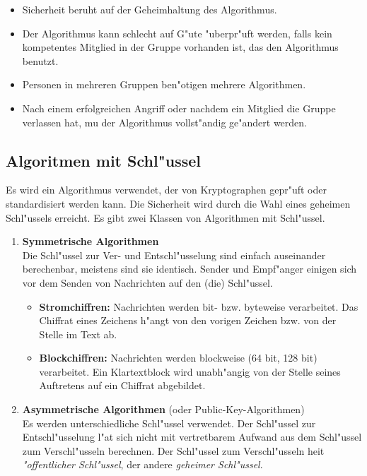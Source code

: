 \begin{itemize}
  \item Sicherheit beruht auf der Geheimhaltung des Algorithmus.
  \item Der Algorithmus kann schlecht auf G"ute "uberpr"uft werden, 
        falls kein kompetentes Mitglied in der Gruppe vorhanden ist, 
        das den Algorithmus benutzt.
  \item Personen in mehreren Gruppen ben"otigen mehrere Algorithmen.
  \item Nach einem erfolgreichen Angriff oder nachdem ein Mitglied die Gruppe
        verlassen hat, mu\3 der Algorithmus vollst"andig ge"andert werden.
\end{itemize}


\subsection*{Algoritmen mit Schl"ussel}

Es wird ein Algorithmus verwendet, der von Kryptographen gepr"uft oder
standardisiert werden kann. Die Sicherheit wird durch die Wahl eines
geheimen Schl"ussels erreicht.  Es gibt zwei Klassen von Algorithmen
mit Schl"ussel.
\begin{enumerate}
  \item{\bf Symmetrische Algorithmen}\\
    Die Schl"ussel zur Ver- und Entschl"usselung sind einfach auseinander berechenbar, 
    meistens sind sie identisch. Sender und Empf"anger einigen sich vor dem Senden 
    von Nachrichten auf den (die) Schl"ussel.
  \begin{itemize}
    \item {\bf  Stromchiffren:} Nachrichten werden bit- bzw. byteweise verarbeitet. 
          Das Chiffrat eines Zeichens h"angt von den vorigen Zeichen bzw. von der Stelle im
          Text ab.
    \item {\bf Blockchiffren:} Nachrichten  werden blockweise (64 bit, 128 bit) verarbeitet. 
          Ein Klartextblock wird unabh"angig von der Stelle seines Auftretens auf ein
          Chiffrat abgebildet.
  \end{itemize}
 \item{\bf Asymmetrische Algorithmen} (oder Public-Key-Algorithmen) \\
  Es werden unterschiedliche Schl"ussel verwendet. Der Schl"ussel zur Entschl"usselung 
  l"a\3t sich nicht mit vertretbarem Aufwand aus dem Schl"ussel zum
  Verschl"usseln berechnen. Der Schl"ussel zum Verschl"usseln hei\3t 
  {\em "offentlicher Schl"ussel}, der andere {\em geheimer Schl"ussel}.
\end{enumerate}


